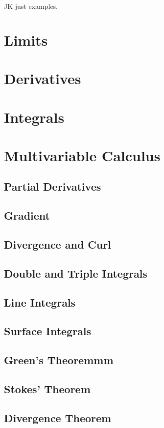\documentclass{article}
\begin{document}
JK just examples.

\section{Limits}


\section{Derivatives}


\section{Integrals}


\section{Multivariable Calculus}

\subsection{Partial Derivatives}
\subsection{Gradient}
\subsection{Divergence and Curl}
\subsection{Double and Triple Integrals}
\subsection{Line Integrals}
\subsection{Surface Integrals}
\subsection{Green's Theoremmm}
\subsection{Stokes' Theorem}
\subsection{Divergence Theorem}
\end{document}
